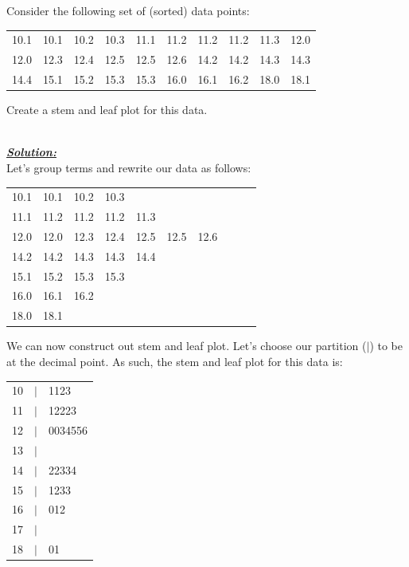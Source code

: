 \begin{example}
Consider the following set of (sorted) data points:
\begin{center}
\begin{tabular}{c c c c c c c c c c}
10.1	&	10.1	&	10.2	&	10.3	&	11.1	&	11.2	&	11.2	&	11.2	&	11.3	&	12.0	\\ 
12.0	&	12.3	&	12.4	&	12.5	&	12.5	&	12.6	&	14.2	&	14.2	&	14.3	&	14.3	\\
14.4	&	15.1	&	15.2	&	15.3	&	15.3	&	16.0	&	16.1	&	16.2	&	 18.0	&	18.1
\end{tabular}
\end{center}

Create a stem and leaf plot for this data.

\vspace*{-0.50em}

\hfill\\
{\emph{\textbf{\underline{Solution:}}}}\\

\noindent
Let's group terms and rewrite our data as follows:
\begin{center}
\begin{tabular}{c c c c c c c c c c}
10.1	&	10.1	&	10.2	&	10.3	\\ 
11.1	&	11.2	&	11.2	&	11.2	&	11.3	\\
12.0	&	12.0	&	12.3	&	12.4	&	12.5	&	12.5	&	12.6	\\
14.2	&	14.2	&	14.3	&	14.3	&	14.4	\\	
15.1	&	15.2	&	15.3	&	15.3	\\
16.0	&	16.1	&	16.2	\\
18.0	&	18.1	\\
\end{tabular}
\end{center}

\noindent
We can now construct out stem and leaf plot. 
Let's choose our partition ($|$) to be at the decimal point.
As such, the stem and leaf plot for this data is:\\

\vspace*{-0.50em}

\begin{center}
\begin{tabular}{r c l}
10	&	$|$	&	1123		\\
11	&	$|$	&	12223	\\
12	&	$|$	&	0034556	\\
13	&	$|$	&			\\
14	&	$|$	&	22334	\\
15	&	$|$	&	1233		\\
16	&	$|$	&	012		\\
17	&	$|$	&			\\
18	&	$|$	&	01
\end{tabular}
\end{center}
\end{example}